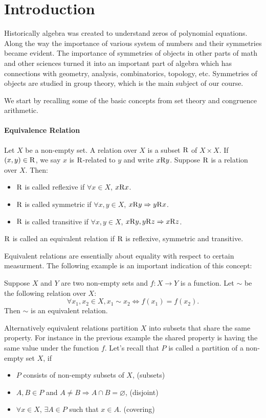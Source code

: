 \section{Introduction}


Historically algebra was created to understand zeros of
polynomial equations. Along the way the importance of various
system of numbers and their symmetries became evident.
The importance of symmetries of objects in other parts of
math and other sciences turned it into an important part of
algebra which has connections with geometry, analysis,
combinatorics, topology, etc. Symmetries of objects are studied
in group theory, which is the main subject of our course.

We start by recalling some of the basic concepts from
set theory and congruence arithmetic.

\paragraph{Equivalence Relation}
Let $X$ be a non-empty set. A relation over $X$ is a subset
$\mathrm{R}$ of $X\times X$. If $(x,y)\in\mathrm{R}$, we say $x$ is $\mathrm{R}$-related
to $y$ and write $x\mathrm{R} y$. Suppose $\mathrm{R}$ is a relation over $X$.
Then:
\begin{itemize}
    \item $\mathrm{R}$ is called reflexive if $\forall x\in X$, $x\mathrm{R} x$.
    \item $\mathrm{R}$ is called symmetric if $\forall x,y\in X$, $x\mathrm{R} y\Rightarrow y\mathrm{R} x$.
    \item $\mathrm{R}$ is called transitive if $\forall x,y\in X$, $x\mathrm{R} y,y\mathrm{R} z\Rightarrow x\mathrm{R} z$.
\end{itemize}

$\mathrm{R}$ is called an equivalent relation if $\mathrm{R}$ is reflexive, symmetric
and transitive.

Equivalent relations are essentially about equality with
respect to certain measurment. The following example
is an important indication of this concept:

\begin{example}
    Suppose $X$ and $Y$ are two non-empty sets and $f:X\to Y$
    is a function. Let $\sim$ be the following relation over $X$:
    \[\forall x_1,x_2\in X,x_1\sim x_2\Longleftrightarrow f(x_1)=f(x_2).\]
    Then $\sim$ is an equivalent relation.
\end{example}

Alternatively equivalent relations partition $X$ into subsets
that share the same property. For instance in the previous example
the shared property is having the same value under the function $f$.
Let's recall that $P$ is called a partition of a non-empty set
$X$, if 
\begin{itemize}
    \item $P$ consists of non-empty subsets of $X$, (subsets)
    \item $A,B\in P$ and $A\neq B\Rightarrow A\cap B=\varnothing$, (disjoint)
    \item $\forall x\in X$, $\exists A\in P$ such that $x\in A$. (covering)
\end{itemize}

